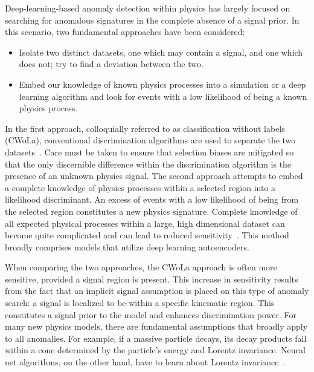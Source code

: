 \documentclass[a4paper,11pt]{article}
\begin{document}
\label{sec:quak}



Deep-learning-based anomaly detection within physics has largely focused on searching for anomalous signatures in the complete absence of a signal prior. In this scenario, two fundamental approaches have been considered: 
\begin{itemize}
\item Isolate two distinct datasets, one which may contain a signal, and one which does not; try to find a deviation between the two. 
\item Embed our knowledge of known physics processes into a simulation or a deep learning algorithm and look for events with a low likelihood of being a known physics process. 
\end{itemize}
In the first approach, colloquially referred to as classification without labels (CWoLa), conventional discrimination algorithms are used to separate the two datasets~\cite{Metodiev:2017vrx,Collins:2018epr,Collins:2019jip,Nachman:2020lpy}. Care must be taken to ensure that selection biases are mitigated so that the only discernible difference within the discrimination algorithm is the presence of an unknown physics signal. The second approach attempts to embed a complete knowledge of physics processes within a selected region into a likelihood discriminant. An excess of events with a low likelihood of being from the selected region constitutes a new physics signature. Complete knowledge of all expected physical processes within a large, high dimensional dataset can become quite complicated and can lead to reduced sensitivity~\cite{Heimel:2018mkt,Farina:2018fyg,Cerri:2018anq,Kuusela_2012}. This method broadly comprises models that utilize deep learning autoencoders. 

When comparing the two approaches, the CWoLa approach is often more sensitive, provided a signal region is present. This increase in sensitivity results from the fact that an implicit signal assumption is placed on this type of anomaly search: a signal is localized to be within a specific kinematic region. This constitutes a signal prior to the model and enhances discrimination power. For many new physics models, there are fundamental assumptions that broadly apply to all anomalies. For example, if a massive particle decays, its decay products fall within a cone determined by the particle's energy and Lorentz invariance. Neural net algorithms, on the other hand, have to learn about Lorentz invariance~\cite{Butter:2019cae}. 
\end{document}
